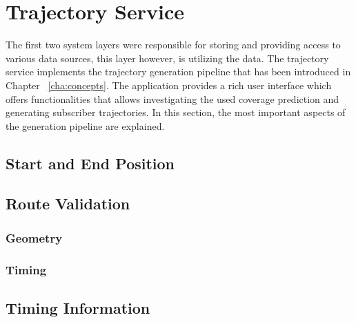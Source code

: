 \documentclass[master,english]{hgbthesis}
\begin{document}
\section{Trajectory Service}
The first two system layers were responsible for storing and providing access to various data sources, this layer however, is utilizing the data. The trajectory service implements the trajectory generation pipeline that has been introduced in Chapter ~\ref{cha:concepts}. The application provides a rich user interface which offers functionalities that allows investigating the used coverage prediction and generating subscriber trajectories. In this section, the most important aspects of the generation pipeline are explained.
\subsection{Start and End Position}
\subsection{Route Validation}
\subsubsection{Geometry}
\subsubsection{Timing}
\subsection{Timing Information}
\end{document}

